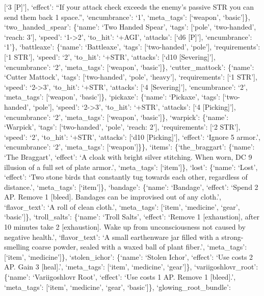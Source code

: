 \documentclass[
  letterpaper,
  DIV=11,
  numbers=noendperiod]{scrartcl}
\begin{document}
{[}`3 {[}P{]}'{]}, `effect': ``If your attack check exceeds the enemy's
passive STR you can send them back 1 space.'', `encumbrance': `1',
`meta\_tags': {[}`weapon', `basic'{]}\}, `two\_handed\_spear': \{`name':
`Two Handed Spear', `tags': {[}`pole', `two-handed', `reach: 3'{]},
`speed': `1-\textgreater2', `to\_hit': `+AGI', `attacks': {[}`d6
{[}P{]}'{]}, `encumbrance': `1'\}, `battleaxe': \{`name': `Battleaxe',
`tags': {[}`two-handed', `pole'{]}, `requirements': {[}`1 STR'{]},
`speed': `2', `to\_hit': `+STR', `attacks': {[}`d10 {[}Severing{]}'{]},
`encumbrance': `2', `meta\_tags': {[}`weapon', `basic'{]}\},
`cutter\_mattock': \{`name': `Cutter Mattock', `tags': {[}`two-handed',
`pole', `heavy'{]}, `requirements': {[}`1 STR'{]}, `speed':
`2-\textgreater3', `to\_hit': `+STR', `attacks': {[}`4
{[}Severing{]}'{]}, `encumbrance': `2', `meta\_tags': {[}`weapon',
`basic'{]}\}, `pickaxe': \{`name': `Pickaxe', `tags': {[}`two-handed',
`pole'{]}, `speed': `2-\textgreater3', `to\_hit': `+STR', `attacks':
{[}`4 {[}Picking{]}'{]}, `encumbrance': `2', `meta\_tags': {[}`weapon',
`basic'{]}\}, `warpick': \{`name': `Warpick', `tags': {[}`two-handed',
`pole', `reach: 2'{]}, `requirements': {[}`2 STR'{]}, `speed': `2',
`to\_hit': `+STR', `attacks': {[}`d10 {[}Picking{]}'{]}, `effect':
`Ignore 5 armor.', `encumbrance': `2', `meta\_tags': {[}`weapon'{]}\}\},
`items': \{`the\_braggart': \{`name': `The Braggart', `effect': `A cloak
with bright silver stitching. When worn, DC 9 illusion of a full set of
plate armor.', `meta\_tags': {[}`item'{]}\}, `lost': \{`name': `Lost',
`effect': `Two stone birds that constantly tug towards each other,
regardless of distance.', `meta\_tags': {[}`item'{]}\}, `bandage':
\{`name': `Bandage', `effect': `Spend 2 AP. Remove 1 {[}bleed{]}.
Bandages can be improvised out of any cloth.', `flavor\_text': `A roll
of clean cloth.', `meta\_tags': {[}`item', `medicine', `gear',
`basic'{]}\}, `troll\_salts': \{`name': `Troll Salts', `effect': `Remove
1 {[}exhaustion{]}, after 10 minutes take 2 {[}exhaustion{]}. Wake up
from unconsciousness not caused by negative health.', `flavor\_text': `A
small earthenware jar filled with a strong-smelling coarse powder,
sealed with a waxed ball of plant fiber.', `meta\_tags': {[}`item',
`medicine'{]}\}, `stolen\_ichor': \{`name': `Stolen Ichor', `effect':
`Use costs 2 AP. Gain 3 {[}heal{]}.', `meta\_tags': {[}`item',
`medicine', `gear'{]}\}, `variigoshlovr\_root': \{`name': `Variigoshlovr
Root', `effect': `Use costs 1 AP. Remove 1 {[}bleed{]}.', `meta\_tags':
{[}`item', `medicine', `gear', `basic'{]}\}, `glowing\_root\_bundle':
\end{document}
